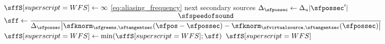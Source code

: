 

\begin{algorithmic}[1]
    \State $\sffS[superscript=WFS] \gets \infty$
        \Comment \eqref{eq:aliasing_frequency}
        \State \Continue 
        \Comment next secondary sources
      \EndIf
      \State $\Delta_{\sfpossec} \gets \Delta_u |\sfpossec'|$
      \State
      $\displaystyle
      \sff \gets
        \frac{\sfspeedofsound}
        {%
        \Delta_{\sfpossec}
        \big|
        \sfknorm_{\sfgreens,\sftangentsec}(\sfpos-\sfpossec) -
        \sfknorm_{\sfvirtualsource,\sftangentsec}(\sfpossec)
        \big|
        }
      $
      \Comment{\eqref{eq:aliasing_frequency_pair}}
      \State $\sffS[superscript=WFS] \gets \min(\sffS[superscript=WFS]; \sff)$
      \Comment{\eqref{eq:aliasing_frequency}}
    \EndFor
    \State \Return $\sffS[superscript=WFS]$
  \EndFunction
\end{algorithmic}

